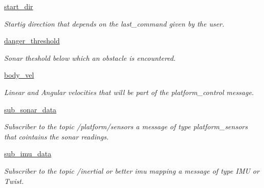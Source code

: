 \begin{DoxyCompactItemize}
\mbox{\hyperlink{classoab__miro_1_1ObstacleAvoidance_a9241219fb6f3e9f4e4a1117660c2833d}{start\+\_\+dir}}
\begin{DoxyCompactList}\small\item\em Startig direction that depends on the last\+\_\+command given by the user. \end{DoxyCompactList}\item 
\mbox{\label{classoab__miro_1_1ObstacleAvoidance_aaf439db92c20b964e43a718a8c5f1c3d}} 
\mbox{\hyperlink{classoab__miro_1_1ObstacleAvoidance_aaf439db92c20b964e43a718a8c5f1c3d}{danger\+\_\+threshold}}
\begin{DoxyCompactList}\small\item\em Sonar theshold below which an obstacle is encountered. \end{DoxyCompactList}\item 
\mbox{\label{classoab__miro_1_1ObstacleAvoidance_a79c75ee545d131758304c200db00628d}} 
\mbox{\hyperlink{classoab__miro_1_1ObstacleAvoidance_a79c75ee545d131758304c200db00628d}{body\+\_\+vel}}
\begin{DoxyCompactList}\small\item\em Linear and Angular velocities that will be part of the platform\+\_\+control message. \end{DoxyCompactList}\item 
\mbox{\label{classoab__miro_1_1ObstacleAvoidance_af2ca6b001b6d5072fae5bb2a8b82de71}} 
\mbox{\hyperlink{classoab__miro_1_1ObstacleAvoidance_af2ca6b001b6d5072fae5bb2a8b82de71}{sub\+\_\+sonar\+\_\+data}}
\begin{DoxyCompactList}\small\item\em Subscriber to the topic /platform/sensors a message of type platform\+\_\+sensors that cointains the sonar readings. \end{DoxyCompactList}\item 
\mbox{\label{classoab__miro_1_1ObstacleAvoidance_a72496bf39cea30e8a13aebae68568c05}} 
\mbox{\hyperlink{classoab__miro_1_1ObstacleAvoidance_a72496bf39cea30e8a13aebae68568c05}{sub\+\_\+imu\+\_\+data}}
\begin{DoxyCompactList}\small\item\em Subscriber to the topic /inertial or better imu mapping a message of type I\+MU or Twist. \end{DoxyCompactList}\item 

\end{DoxyCompactItemize}
